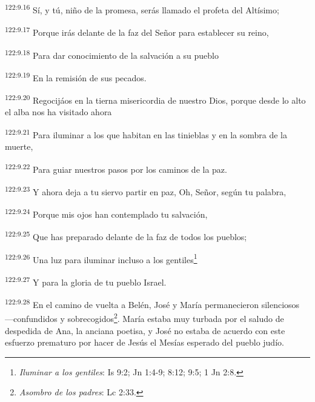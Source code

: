 \par 
\textsuperscript{122:9.16} Sí, y tú, niño de la promesa, serás llamado el profeta del Altísimo;

\par 
\textsuperscript{122:9.17} Porque irás delante de la faz del Señor para establecer su reino,

\par 
\textsuperscript{122:9.18} Para dar conocimiento de la salvación a su pueblo

\par 
\textsuperscript{122:9.19} En la remisión de sus pecados.

\par 
\textsuperscript{122:9.20} Regocijáos en la tierna misericordia de nuestro Dios, porque desde lo alto el alba nos ha visitado ahora

\par 
\textsuperscript{122:9.21} Para iluminar a los que habitan en las tinieblas y en la sombra de la muerte,

\par 
\textsuperscript{122:9.22} Para guiar nuestros pasos por los caminos de la paz.

\par 
\textsuperscript{122:9.23} Y ahora deja a tu siervo partir en paz, Oh, Señor, según tu palabra,

\par 
\textsuperscript{122:9.24} Porque mis ojos han contemplado tu salvación,

\par 
\textsuperscript{122:9.25} Que has preparado delante de la faz de todos los pueblos;

\par 
\textsuperscript{122:9.26} Una luz para iluminar incluso a los gentiles\footnote{\textit{Iluminar a los gentiles}: Is 9:2; Jn 1:4-9; 8:12; 9:5; 1 Jn 2:8.}

\par 
\textsuperscript{122:9.27} Y para la gloria de tu pueblo Israel.

\par 
\textsuperscript{122:9.28} En el camino de vuelta a Belén, José y María permanecieron silenciosos ---confundidos y sobrecogidos\footnote{\textit{Asombro de los padres}: Lc 2:33.}. María estaba muy turbada por el saludo de despedida de Ana, la anciana poetisa, y José no estaba de acuerdo con este esfuerzo prematuro por hacer de Jesús el Mesías esperado del pueblo judío.

